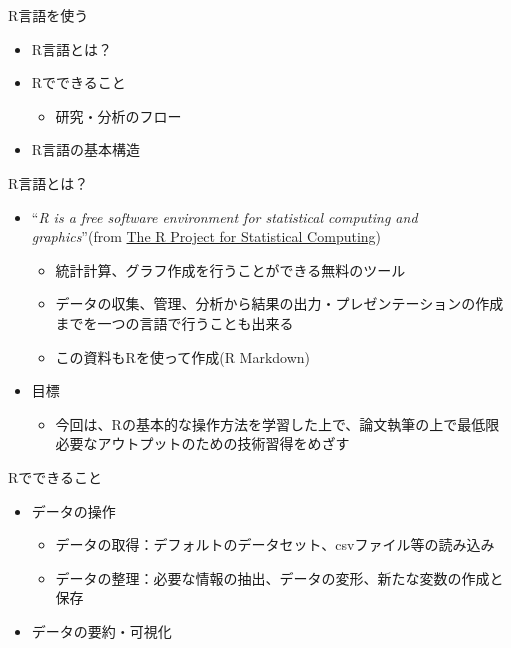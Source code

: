 \documentclass[
  ignorenonframetext,
]{beamer}
\providecommand{\tightlist}{%
  \setlength{\itemsep}{0pt}\setlength{\parskip}{0pt}}
\begin{document}
\begin{frame}[fragile]{R言語を使う}
\protect\hypertarget{rux8a00ux8a9eux3092ux4f7fux3046}{}
\begin{itemize}
\tightlist
\item
  R言語とは？
\item
  Rでできること

  \begin{itemize}
  \tightlist
  \item
    研究・分析のフロー
  \end{itemize}
\item
  R言語の基本構造
\end{itemize}

\begin{block}{R言語とは？}
\protect\hypertarget{rux8a00ux8a9eux3068ux306f}{}
\begin{itemize}
\item
  ``\emph{R is a free software environment for statistical computing and
  graphics}''(from \href{https://www.r-project.org/}{The R Project for
  Statistical Computing})

  \begin{itemize}
  \tightlist
  \item
    統計計算、グラフ作成を行うことができる無料のツール
  \item
    データの収集、管理、分析から結果の出力・プレゼンテーションの作成までを一つの言語で行うことも出来る
  \item
    この資料もRを使って作成(R Markdown)
  \end{itemize}
\item
  目標

  \begin{itemize}
  \tightlist
  \item
    今回は、Rの基本的な操作方法を学習した上で、論文執筆の上で最低限必要なアウトプットのための技術習得をめざす
  \end{itemize}
\end{itemize}
\end{block}

\begin{block}{Rでできること}
\protect\hypertarget{rux3067ux3067ux304dux308bux3053ux3068}{}
\begin{itemize}
\item
  データの操作

  \begin{itemize}
  \tightlist
  \item
    データの取得：デフォルトのデータセット、csvファイル等の読み込み
  \item
    データの整理：必要な情報の抽出、データの変形、新たな変数の作成と保存
  \end{itemize}
\item
  データの要約・可視化


\end{itemize}
\end{block}
\end{frame}
\end{document}

